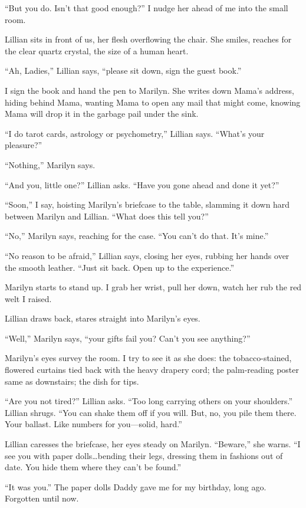 \documentclass[
]{article}
\begin{document}
``But you do. Isn't that good enough?'' I nudge her ahead of me into the
small room.

Lillian sits in front of us, her flesh overflowing the chair. She
smiles, reaches for the clear quartz crystal, the size of a human heart.

``Ah, Ladies,'' Lillian says, ``please sit down, sign the guest book.''

I sign the book and hand the pen to Marilyn. She writes down Mama's
address, hiding behind Mama, wanting Mama to open any mail that might
come, knowing Mama will drop it in the garbage pail under the sink.

``I do tarot cards, astrology or psychometry,'' Lillian says. ``What's
your pleasure?''

``Nothing,'' Marilyn says.

``And you, little one?'' Lillian asks. ``Have you gone ahead and done it
yet?''

``Soon,'' I say, hoisting Marilyn's briefcase to the table, slamming it
down hard between Marilyn and Lillian. ``What does this tell you?''

``No,'' Marilyn says, reaching for the case. ``You can't do that. It's
mine.''

``No reason to be afraid,'' Lillian says, closing her eyes, rubbing her
hands over the smooth leather. ``Just sit back. Open up to the
experience.''

Marilyn starts to stand up. I grab her wrist, pull her down, watch her
rub the red welt I raised.

Lillian draws back, stares straight into Marilyn's eyes.

``Well,'' Marilyn says, ``your gifts fail you? Can't you see anything?''

Marilyn's eyes survey the room. I try to see it as she does: the
tobacco-stained, flowered curtains tied back with the heavy drapery
cord; the palm-reading poster same as downstairs; the dish for tips.

``Are you not tired?'' Lillian asks. ``Too long carrying others on your
shoulders.'' Lillian shrugs. ``You can shake them off if you will. But,
no, you pile them there. Your ballast. Like numbers for you---solid,
hard.''

Lillian caresses the briefcase, her eyes steady on Marilyn. ``Beware,''
she warns. ``I see you with paper dolls\ldots bending their legs,
dressing them in fashions out of date. You hide them where they can't be
found.''

``It was you.'' The paper dolls Daddy gave me for my birthday, long ago.
Forgotten until now.
\end{document}
